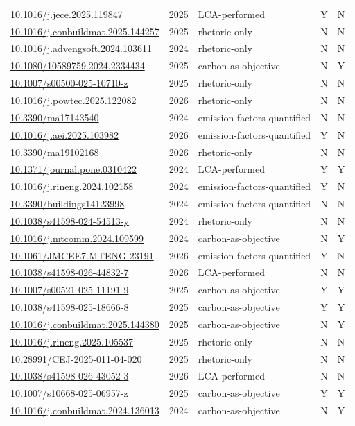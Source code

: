 \documentclass[pdflatex,sn-basic]{sn-jnl}
\begin{document}
{\begin{longtable}{p{}lp{}lp{}}
\url{10.1016/j.jece.2025.119847} & 2025 & LCA-performed & Y & N \\
\url{10.1016/j.conbuildmat.2025.144257} & 2025 & rhetoric-only & N & N \\
\url{10.1016/j.advengsoft.2024.103611} & 2024 & rhetoric-only & N & N \\
\url{10.1080/10589759.2024.2334434} & 2025 & carbon-as-objective & N & Y \\
\url{10.1007/s00500-025-10710-z} & 2025 & rhetoric-only & N & N \\
\url{10.1016/j.powtec.2025.122082} & 2026 & rhetoric-only & N & N \\
\url{10.3390/ma17143540} & 2024 & emission-factors-quantified & N & N \\
\url{10.1016/j.aei.2025.103982} & 2026 & emission-factors-quantified & Y & N \\
\url{10.3390/ma19102168} & 2026 & rhetoric-only & N & N \\
\url{10.1371/journal.pone.0310422} & 2024 & LCA-performed & Y & Y \\
\url{10.1016/j.rineng.2024.102158} & 2024 & emission-factors-quantified & Y & N \\
\url{10.3390/buildings14123998} & 2024 & emission-factors-quantified & N & N \\
\url{10.1038/s41598-024-54513-y} & 2024 & rhetoric-only & N & N \\
\url{10.1016/j.mtcomm.2024.109599} & 2024 & carbon-as-objective & N & Y \\
\url{10.1061/JMCEE7.MTENG-23191} & 2026 & emission-factors-quantified & Y & N \\
\url{10.1038/s41598-026-44832-7} & 2026 & LCA-performed & N & N \\
\url{10.1007/s00521-025-11191-9} & 2025 & carbon-as-objective & Y & Y \\
\url{10.1038/s41598-025-18666-8} & 2025 & carbon-as-objective & Y & Y \\
\url{10.1016/j.conbuildmat.2025.144380} & 2025 & carbon-as-objective & N & Y \\
\url{10.1016/j.rineng.2025.105537} & 2025 & rhetoric-only & N & N \\
\url{10.28991/CEJ-2025-011-04-020} & 2025 & rhetoric-only & N & N \\
\url{10.1038/s41598-026-43052-3} & 2026 & LCA-performed & N & N \\
\url{10.1007/s10668-025-06957-z} & 2025 & carbon-as-objective & Y & Y \\
\url{10.1016/j.conbuildmat.2024.136013} & 2024 & carbon-as-objective & N & Y \\

\end{longtable}}
\end{document}
